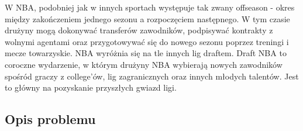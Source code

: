 \documentclass{article}
\begin{document}
W NBA, podobniej jak w innych sportach występuje tak zwany offseason - okres między zakończeniem jednego sezonu a rozpoczęciem następnego. W tym czasie drużyny mogą dokonywać transferów zawodników, podpisywać kontrakty z wolnymi agentami oraz przygotowywać się do nowego sezonu poprzez treningi i mecze towarzyskie. \newline
NBA wyróżnia się na tle innych lig draftem. Draft NBA to coroczne wydarzenie, w którym drużyny NBA wybierają nowych zawodników spośród graczy z college'ów, lig zagranicznych oraz innych młodych talentów. Jest to główny na pozyskanie przyszłych gwiazd ligi.

\newpage
\subsection{Opis problemu} \label{opis}
\end{document}
